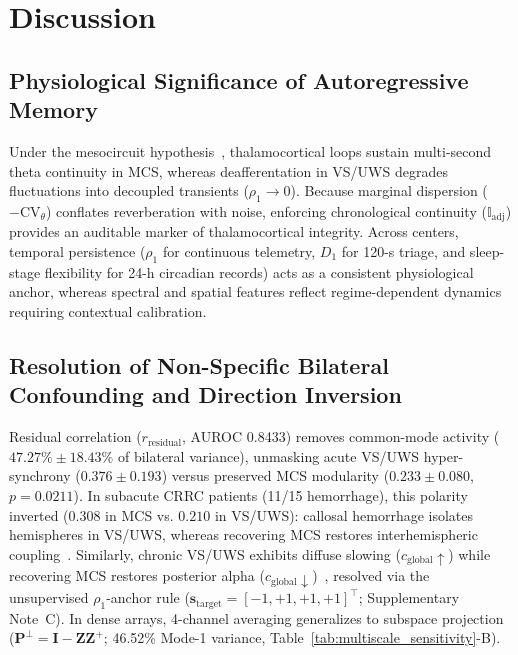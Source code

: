 \documentclass[journal,twoside,web]{ieeecolor}
\begin{document}
\vspace{-2pt}

\section{Discussion}
\vspace{-2pt}
\vspace{-2pt}
\subsection{Physiological Significance of Autoregressive Memory}
Under the mesocircuit hypothesis~\cite{schiff2010recovery}, thalamocortical loops sustain multi-second theta continuity in MCS, whereas deafferentation in VS/UWS degrades fluctuations into decoupled transients ($\rho_1 \to 0$). Because marginal dispersion ($-\mathrm{CV}_\theta$) conflates reverberation with noise, enforcing chronological continuity ($\mathbb{I}_{\text{adj}}$) provides an auditable marker of thalamocortical integrity. Across centers, temporal persistence ($\rho_1$ for continuous telemetry, $D_1$ for 120-s triage, and sleep-stage flexibility for 24-h circadian records) acts as a consistent physiological anchor, whereas spectral and spatial features reflect regime-dependent dynamics requiring contextual calibration.



\vspace{-3pt}
\subsection{Resolution of Non-Specific Bilateral Confounding and Direction Inversion}
Residual correlation ($r_{\text{residual}}$, AUROC 0.8433) removes common-mode activity ($47.27\% \pm 18.43\%$ of bilateral variance), unmasking acute VS/UWS hyper-synchrony ($0.376 \pm 0.193$) versus preserved MCS modularity ($0.233 \pm 0.080$, $p = 0.0211$). In subacute CRRC patients (11/15 hemorrhage), this polarity inverted ($0.308$ in MCS vs. $0.210$ in VS/UWS): callosal hemorrhage isolates hemispheres in VS/UWS, whereas recovering MCS restores interhemispheric coupling~\cite{schiff2010recovery,chennu2017brain}. Similarly, chronic VS/UWS exhibits diffuse slowing ($c_{\text{global}} \uparrow$) while recovering MCS restores posterior alpha ($c_{\text{global}} \downarrow$)~\cite{bareham2020spectral}, resolved via the unsupervised $\rho_1$-anchor rule ($\mathbf{s}_{\text{target}} = [-1, +1, +1, +1]^\top$; Supplementary Note~C). In dense arrays, 4-channel averaging generalizes to subspace projection ($\mathbf{P}^\perp = \mathbf{I} - \mathbf{Z}\mathbf{Z}^+$; 46.52\% Mode-1 variance, Table~\ref{tab:multiscale_sensitivity}-B).
\end{document}

